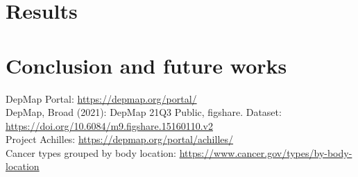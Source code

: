 \documentclass[a4paper,11pt, oneside]{article}  %
\begin{document}
\section{Results}


\section{Conclusion and future works}



\begin{thebibliography}{11}   %
 DepMap Portal: \url{https://depmap.org/portal/}  \\
 DepMap, Broad (2021): DepMap 21Q3 Public, figshare. Dataset: \url{https://doi.org/10.6084/m9.figshare.15160110.v2} \\
 Project Achilles: \url{https://depmap.org/portal/achilles/}  \\
 Cancer types grouped by body location: \url{https://www.cancer.gov/types/by-body-location} \\
\end{thebibliography}
\end{document}
